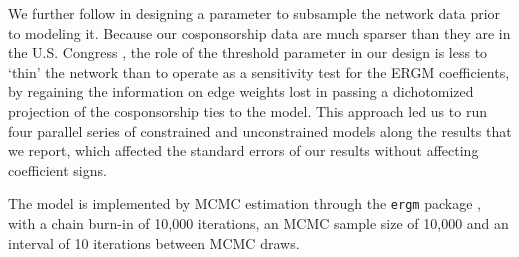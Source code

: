 \begin{description}
  We further follow \citet[p.~78]{CranmerDesmarais2011-PA} in designing a parameter to subsample the network data prior to modeling it. Because our cosponsorship data are much sparser than they are in the U.S. Congress \citep{Fowler2006-PA}, the role of the threshold parameter in our design is less to `thin' the network than to operate as a sensitivity test for the ERGM coefficients, by regaining the information on edge weights lost in passing a dichotomized projection of the cosponsorship ties to the model. This approach led us to run four parallel series of constrained and unconstrained models along the results that we report, which affected the standard errors of our results without affecting coefficient signs.%

  The model is implemented by MCMC estimation through the \texttt{ergm} package \citep{HunterHandcock2008-JSS}, with a chain burn-in of 10,000 iterations, an MCMC sample size of 10,000 and an interval of 10 iterations between MCMC draws.%

\end{description}
